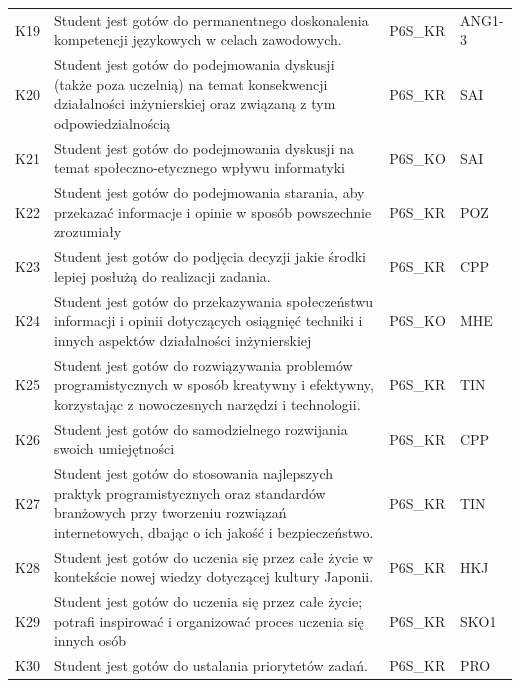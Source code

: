 \documentclass[12pt,a4paper]{article}
\begin{document}
{\begin{longtable}{m{1cm}m{8.8cm}m{2.1cm}m{2.5cm}}
\rowcolor{tableRowLight} K19 & Student jest gotów do permanentnego doskonalenia kompetencji językowych w celach zawodowych. & {\scriptsize P6S\_KR} & {\scriptsize ANG1-3} \\
\rowcolor{tableRowAlt} K20 & Student jest gotów do podejmowania dyskusji (także poza uczelnią) na temat konsekwencji działalności inżynierskiej oraz związaną z tym odpowiedzialnością & {\scriptsize P6S\_KR} & {\scriptsize SAI} \\
\rowcolor{tableRowLight} K21 & Student jest gotów do podejmowania dyskusji na temat społeczno-etycznego wpływu informatyki & {\scriptsize P6S\_KO} & {\scriptsize SAI} \\
\rowcolor{tableRowAlt} K22 & Student jest gotów do podejmowania starania, aby przekazać informacje i opinie w sposób powszechnie zrozumiały & {\scriptsize P6S\_KR} & {\scriptsize POZ} \\
\rowcolor{tableRowLight} K23 & Student jest gotów do podjęcia decyzji jakie środki lepiej posłużą do realizacji zadania. & {\scriptsize P6S\_KR} & {\scriptsize CPP} \\
\rowcolor{tableRowAlt} K24 & Student jest gotów do przekazywania społeczeństwu informacji i opinii dotyczących osiągnięć techniki i innych aspektów działalności inżynierskiej & {\scriptsize P6S\_KO} & {\scriptsize MHE} \\
\rowcolor{tableRowLight} K25 & Student jest gotów do rozwiązywania problemów programistycznych w sposób kreatywny i efektywny, korzystając z nowoczesnych narzędzi i technologii. & {\scriptsize P6S\_KR} & {\scriptsize TIN} \\
\rowcolor{tableRowAlt} K26 & Student jest gotów do samodzielnego rozwijania swoich umiejętności & {\scriptsize P6S\_KR} & {\scriptsize CPP} \\
\rowcolor{tableRowLight} K27 & Student jest gotów do stosowania najlepszych praktyk programistycznych oraz standardów branżowych przy tworzeniu rozwiązań internetowych, dbając o ich jakość i bezpieczeństwo. & {\scriptsize P6S\_KR} & {\scriptsize TIN} \\
\rowcolor{tableRowAlt} K28 & Student jest gotów do uczenia się przez całe życie w kontekście nowej wiedzy dotyczącej kultury Japonii. & {\scriptsize P6S\_KR} & {\scriptsize HKJ} \\
\rowcolor{tableRowLight} K29 & Student jest gotów do uczenia się przez całe życie; potrafi inspirować i organizować proces uczenia się innych osób & {\scriptsize P6S\_KR} & {\scriptsize SKO1} \\
\rowcolor{tableRowAlt} K30 & Student jest gotów do ustalania priorytetów zadań. & {\scriptsize P6S\_KR} & {\scriptsize PRO} \\

\end{longtable}}
\end{document}
